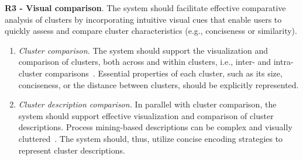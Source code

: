 \documentclass[preprint,journal]{vgtc}            %
\begin{document}
\noindent 
\textbf{R3 - Visual comparison}. 
The system should facilitate effective comparative analysis of clusters by incorporating intuitive visual cues that enable users to quickly assess and compare cluster characteristics (e.g., conciseness or similarity).
\begin{enumerate}[label=T\arabic*., start=5, left=0cm, noitemsep, topsep=0pt, parsep=0pt]
    \item \textit{Cluster comparison.} 
    The system should support the visualization and comparison of clusters, both across and within clusters, i.e., inter- and intra-cluster comparisons~\cite{Everitt11Cluster}.
    Essential properties of each cluster, such as its size, conciseness, or the distance between clusters, should be explicitly represented.

    \item \textit{Cluster description comparison.} 
    In parallel with cluster comparison, the system should support effective visualization and comparison of cluster descriptions.
    Process mining-based descriptions can be complex and visually cluttered~\cite{Miksch24Visual}.
    The system should, thus, utilize concise encoding strategies to represent cluster descriptions.        
\end{enumerate}
\end{document}
